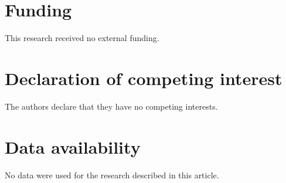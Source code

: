 \documentclass[final,5p,times,twocolumn]{elsarticle}
\begin{document}
\section*{Funding}
This research received no external funding.

\section*{Declaration of competing interest}
The authors declare that they have no competing interests.

\section*{Data availability}
No data were used for the research described in this article.



\end{document}
